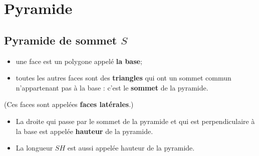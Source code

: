 \section{Pyramide}
\subsection{Pyramide de sommet $S$}
\begin{minipage}{0.7\linewidth}
    \begin{definition}
        \begin{itemize}
            \item une face est un polygone appelé {\bf la base};
            \item toutes les autres faces sont des {\bf triangles} qui ont un sommet commun  
            n'appartenant pas à la base : c'est le {\bf sommet} de la pyramide.
        \end{itemize} 
        (Ces faces sont appelées {\bf faces latérales}.)
    \end{definition}

    \begin{definition}
        \begin{itemize}
            \item La droite qui passe par le sommet de la pyramide et qui est perpendiculaire à la base est appelée {\bf hauteur} de la pyramide.
            \item La longueur $SH$ est aussi appelée hauteur de la pyramide.
        \end{itemize}
    \end{definition}
\end{minipage}
\hspace*{-15mm}
